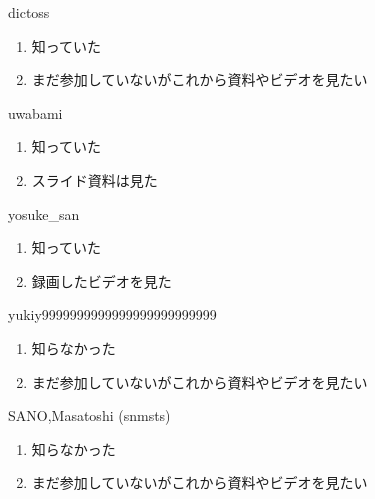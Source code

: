 \begin{prework}{ dictoss }
  \begin{enumerate}
  \item 知っていた
  \item まだ参加していないがこれから資料やビデオを見たい
  \end{enumerate}
\end{prework}

\begin{prework}{ uwabami }
  \begin{enumerate}
  \item 知っていた
  \item スライド資料は見た
  \end{enumerate}
\end{prework}

\begin{prework}{ yosuke\_san }
  \begin{enumerate}
  \item 知っていた
  \item 録画したビデオを見た
  \end{enumerate}
\end{prework}

\begin{prework}{ yukiy9999999999999999999999999 }
  \begin{enumerate}
  \item 知らなかった
  \item まだ参加していないがこれから資料やビデオを見たい
  \end{enumerate}
\end{prework}

\begin{prework}{ SANO,Masatoshi (snmsts) }
  \begin{enumerate}
  \item 知らなかった
  \item まだ参加していないがこれから資料やビデオを見たい
  \end{enumerate}
\end{prework}
